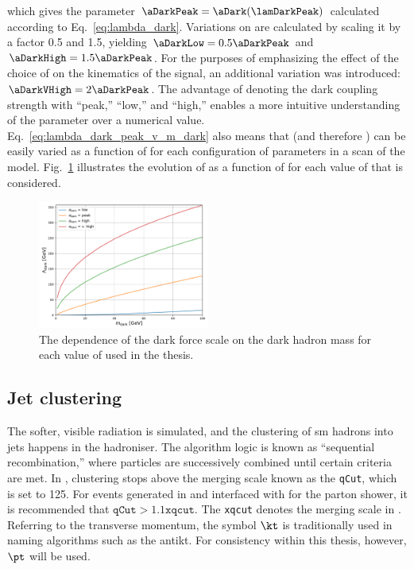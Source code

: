 which gives the parameter $\aDarkPeak = \aDark(\lamDarkPeak)$ calculated according to Eq.~\ref{eq:lambda_dark}. Variations on \aDark are calculated by scaling it by a factor 0.5 and 1.5, yielding $\aDarkLow = \text{0.5}\aDarkPeak$ and $\aDarkHigh = \text{1.5}\aDarkPeak$. For the purposes of emphasizing the effect of the choice of \aDark on the kinematics of the signal, an additional variation was introduced: $\aDarkVHigh = \text{2}\aDarkPeak$. The advantage of denoting the dark coupling strength with ``peak,'' ``low,'' and ``high,'' enables a more intuitive understanding of the parameter over a numerical value. Eq.~\ref{eq:lambda_dark_peak_v_m_dark} also means that \lamDark (and therefore \aDark) can be easily varied as a function of \mDark for each configuration of parameters in a scan of the model. Fig.~\ref{fig:svj_lamDark_vs_mDark} illustrates the evolution of \lamDark as a function of \mDark for each value of \aDark that is considered.

\begin{figure}[htbp]
    \centering
    \includegraphics[width=0.5\textwidth]{figures/lambda_dark_vs_mDark_with_vHigh.pdf}
    \caption[The dependence of the dark force scale \lamDark on the dark hadron mass \mDark for each value of \aDark used in the thesis]{The dependence of the dark force scale \lamDark on the dark hadron mass \mDark for each value of \aDark used in the thesis.}
    \label{fig:svj_lamDark_vs_mDark}
\end{figure}




\subsection{Jet clustering}
\label{subsec:svj_pythia_jet_clustering}

The softer, visible radiation is simulated, and the clustering of \acrshort{sm} hadrons into \glspl{jet} happens in the hadroniser. The algorithm logic is known as ``sequential recombination,'' where particles are successively combined until certain criteria are met. In \PYTHIA, clustering stops above the merging scale known as the \texttt{qCut}, which is set to 125\GeV. For events generated in \MADGRAPH and interfaced with \PYTHIA for the parton shower, it is recommended that $\texttt{qCut} > 1.1 \texttt{xqcut}$. The \texttt{xqcut} denotes the merging scale in \MADGRAPH. Referring to the transverse momentum, the symbol $\kt$ is traditionally used in naming algorithms such as the \gls{antikt}. For consistency within this thesis, however, $\pt$ will be used.

